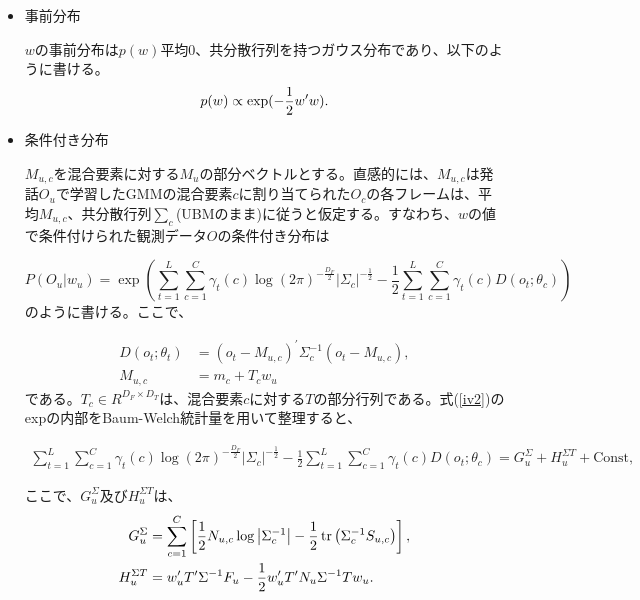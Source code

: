 \begin{itemize}
\item 事前分布\par
$w$の事前分布は$p(w)$平均0、共分散行列を持つガウス分布であり、以下のように書ける。
\begin{equation}
p(w)\propto \exp(-\frac{1}{2}w^{\prime}w). \notag
\end{equation}

\item 条件付き分布\par
$M_{u,c}$を混合要素に対する$M_u$の部分ベクトルとする。直感的には、$M_{u,c}$は発話$O_u$で学習したGMMの混合要素$c$に割り当てられた$O_c$の各フレームは、平均$M_{u,c}$、共分散行列$\sum_{c}$(UBMのまま)に従うと仮定する。すなわち、$w$の値で条件付けられた観測データ$O$の条件付き分布は

\begin{equation}
\label{iv2}
P(O_u|w_u)=\exp\left(\sum_{t=1}^{L}\sum_{c=1}^{C}\gamma_t(c)\log(2\pi )^{-\frac{D_F}{2}}\left|\Sigma_{c}\right|^{-\frac{1}{2}}-\frac{1}{2}\sum_{t=1}^{L}\sum_{c=1}^{C}\gamma_t(c)D(o_t;\theta_c) \right)
\end{equation}
のように書ける。ここで、

\begin{align}
D(o_t;\theta_t) &=(o_t-M_{u,c})^\prime \Sigma_{c}^{-1}(o_t-M_{u,c}), \\
M_{u,c} &=m_c+T_cw_u
\end{align}
である。$T_c\in R^{D_F\times D_T}$は、混合要素$c$に対する$T$の部分行列である。式(\ref{iv2})のexpの内部をBaum-Welch統計量を用いて整理すると、

\begin{equation}
\begin{split}
\sum_{t=1}^{L}\sum_{c=1}^{C}\gamma_t(c)\log(2\pi )^{-\frac{D_F}{2}}\left|\Sigma_{c}\right|^{-\frac{1}{2}}-\frac{1}{2}\sum_{t=1}^{L}\sum_{c=1}^{C}\gamma_t(c)D(o_t;\theta_c)=G_u^\Sigma+H_u^{\Sigma T}+\text{Const,}
\end{split}
\end{equation}

ここで、$G_u^\Sigma$及び$H_u^{\Sigma T}$は、
\begin{align}
G_u^\Sigma &=\sum_{c=1}^C\left[\frac{1}{2}N_{u,c}\log\left|\Sigma_c^{-1}\right|-\frac{1}{2}\tr\left(\Sigma_c^{-1}S_{u,c}\right)\right], \\
H_u^{\Sigma T} &=w_u^\prime T^\prime \Sigma^{-1}F_u-\frac{1}{2}w_u^\prime T^\prime N_u\Sigma^{-1}Tw_u. \label{iv3}
\end{align}


\end{itemize}

